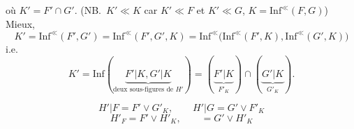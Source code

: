 \documentclass[11pt,a4paper]{article}
\begin{document}

où $K' = F' \cap G'$. (NB.\ $K' \ll K$ car $K' \ll F$ et $K' \ll G$, $K = \mathrm{Inf}^{\ll}(F, G)$)  Mieux,
\[
  K' = \mathrm{Inf}^{\ll}(F', G') = \mathrm{Inf}^{\ll}(F', G', K) = \mathrm{Inf}^{\ll}\bigl(\mathrm{Inf}^{\ll}(F', K), \mathrm{Inf}^{\ll}(G', K)\bigr)
\]
i.e.
\[
  K' = \mathrm{Inf}(\underbrace{F'|K, G'|K}_{\text{deux sous-figures de } H'}) = (\underbrace{F'|K}_{F'_K}) \cap (\underbrace{G'|K}_{G'_K}) .
\]

\[
  H'|F = F' \vee G'_K, \qquad H'|G = G' \vee F'_K
\]
\[
  H'_F = F' \vee H'_K, \qquad = G' \vee H'_K
\]
\end{document}
